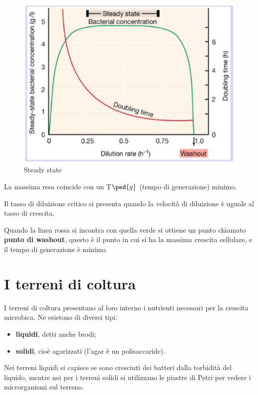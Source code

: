 \documentclass[11pt]{book}
\begin{document}
\clearpage
\begin{figure}[htp]
\centering
\includegraphics[scale=0.4]{img/DIlavamento.png}
\caption{Steady state}
\label{}
\end{figure}

La massima resa coincide con un T$\ped{g}$ (tempo di generazione) minimo.

Il tasso di diluizione critico si presenta quando la velocità di diluizione è uguale al tasso di crescita.

Quando la linea rossa si incontra con quella verde si ottiene un punto chiamato \textbf{punto di washout}, questo è il punto in cui si ha la massima crescita cellulare, e il tempo di generazione è minimo. 


\section{I terreni di coltura}
I terreni di coltura presentano al loro interno i nutrienti necessari per la crescita microbica.
Ne esistono di diversi tipi: 
\begin{itemize}
\item \textbf{liquidi}, detti anche brodi;
\item \textbf{solidi}, cioè agarizzati (l'agar è un polisaccaride).
\end{itemize}

Nei terreni liquidi si capisce se sono cresciuti dei batteri dalla torbidità del liquido, mentre nei per i terreni solidi si utilizzano le piastre di Petri per vedere i microrganismi sul terreno.
\end{document}
